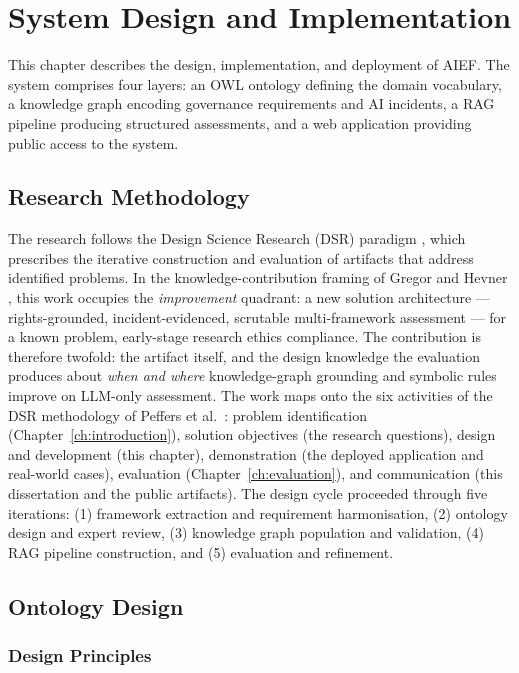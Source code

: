 \chapter{System Design and Implementation}
\label{ch:design}

This chapter describes the design, implementation, and deployment of AIEF. The system comprises four layers: an OWL ontology defining the domain vocabulary, a knowledge graph encoding governance requirements and AI incidents, a RAG pipeline producing structured assessments, and a web application providing public access to the system.


\section{Research Methodology}

The research follows the Design Science Research (DSR) paradigm \cite{hevner2004}, which prescribes the iterative construction and evaluation of artifacts that address identified problems. In the knowledge-contribution framing of Gregor and Hevner \cite{gregor2013}, this work occupies the \emph{improvement} quadrant: a new solution architecture --- rights-grounded, incident-evidenced, scrutable multi-framework assessment --- for a known problem, early-stage research ethics compliance. The contribution is therefore twofold: the artifact itself, and the design knowledge the evaluation produces about \emph{when and where} knowledge-graph grounding and symbolic rules improve on LLM-only assessment. The work maps onto the six activities of the DSR methodology of Peffers et al.\ \cite{peffers2007}: problem identification (Chapter~\ref{ch:introduction}), solution objectives (the research questions), design and development (this chapter), demonstration (the deployed application and real-world cases), evaluation (Chapter~\ref{ch:evaluation}), and communication (this dissertation and the public artifacts). The design cycle proceeded through five iterations: (1) framework extraction and requirement harmonisation, (2) ontology design and expert review, (3) knowledge graph population and validation, (4) RAG pipeline construction, and (5) evaluation and refinement.


\section{Ontology Design}
\label{sec:ontology}

\subsection{Design Principles}

